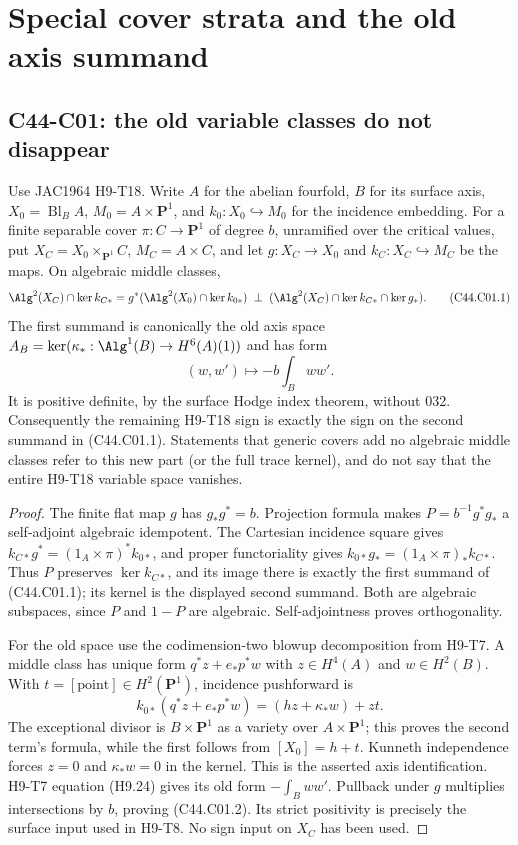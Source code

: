 \section{Special cover strata and the old axis summand}

\subsection{C44-C01: the old variable classes do not disappear}
\begin{proposition}[C44-C01]\label{prop:old-axis-cover}
Use JAC1964 H9-T18. Write $A$ for the abelian fourfold, $B$ for its
surface axis, $X_0=\operatorname{Bl}_B A$, $M_0=A\times\mathbf P^1$,
and $k_0:X_0\hookrightarrow M_0$ for the incidence embedding.
For a finite separable cover $\pi:C\to\mathbf P^1$ of degree $b$,
unramified over the critical values, put
$X_C=X_0\times_{\mathbf P^1}C$, $M_C=A\times C$, and let $g:X_C\to X_0$
and $k_C:X_C\hookrightarrow M_C$ be the maps. On algebraic middle classes,
\[
 \Alg^2(X_C)\cap\ker k_{C*}
 =g^*(\Alg^2(X_0)\cap\ker k_{0*})\ \mathbin\perp\
   (\Alg^2(X_C)\cap\ker k_{C*}\cap\ker g_*).
 \tag{C44.C01.1}
\]
The first summand is canonically the old axis space
$A_B=\ker(\kappa_*:\Alg^1(B)\to H^6(A)(1))$ and has form
\[
          (w,w')\longmapsto-b\int_Bww'.                 \tag{C44.C01.2}
\]
It is positive definite, by the surface Hodge index theorem, without 032.
Consequently the remaining H9-T18 sign is exactly the sign on the second
summand in (C44.C01.1). Statements that generic covers add no algebraic
middle classes refer to this new part (or the full trace kernel), and do
not say that the entire H9-T18 variable space vanishes.
\end{proposition}
\begin{proof}
The finite flat map $g$ has $g_*g^*=b$. Projection formula makes
$P=b^{-1}g^*g_*$ a self-adjoint algebraic idempotent. The Cartesian
incidence square gives
$k_{C*}g^*=(1_A\times\pi)^*k_{0*}$, and proper functoriality gives
$k_{0*}g_*=(1_A\times\pi)_*k_{C*}$. Thus $P$ preserves
$\ker k_{C*}$, and its image there is exactly the first summand of
(C44.C01.1); its kernel is the displayed second summand. Both are
algebraic subspaces, since $P$ and $1-P$ are algebraic. Self-adjointness
proves orthogonality.

For the old space use the codimension-two blowup decomposition from
H9-T7. A middle class has unique form $q^*z+e_*p^*w$ with
$z\in H^4(A)$ and $w\in H^2(B)$. With
$t=[\mathrm{point}]\in H^2(\mathbf P^1)$, incidence pushforward is
\[
 k_{0*}(q^*z+e_*p^*w)=(hz+\kappa_*w)+zt.
\]
The exceptional divisor is $B\times\mathbf P^1$ as a variety over
$A\times\mathbf P^1$; this proves the second term's formula, while
the first follows from $[X_0]=h+t$. Kunneth independence forces $z=0$
and $\kappa_*w=0$ in the kernel. This is the asserted axis identification.
H9-T7 equation (H9.24) gives its old form $-\int_Bww'$. Pullback under
$g$ multiplies intersections by $b$, proving (C44.C01.2). Its strict
positivity is precisely the surface input used in H9-T8. No sign input
on $X_C$ has been used.
\end{proof}

